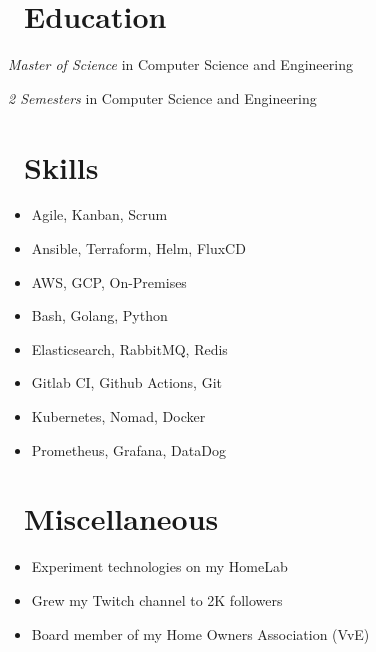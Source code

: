 \documentclass{resume}
\begin{document}
\begin{minipage}[t]{0.30\textwidth}
\section{\texorpdfstring{\textbf{}\ Education}{Education}}

\textit{Master of Science} in Computer Science and Engineering

\textit{2 Semesters} in Computer Science and Engineering

\section{\texorpdfstring{\textbf{}\ Skills}{Skills}}

\begin{itemize}[parsep=0.5ex]
  \item Agile, Kanban, Scrum
  \item Ansible, Terraform, Helm, FluxCD
  \item AWS, GCP, On-Premises
  \item Bash, Golang, Python
  \item Elasticsearch, RabbitMQ, Redis
  \item Gitlab CI, Github Actions, Git
  \item Kubernetes, Nomad, Docker
  \item Prometheus, Grafana, DataDog
\end{itemize}

\section{\texorpdfstring{\textbf{}\ Miscellaneous}{Miscellaneous}}
\begin{itemize}[parsep=0.5ex]
  \item Experiment technologies on my HomeLab
  \item Grew my Twitch channel to 2K followers
  \item Board member of my Home Owners Association (VvE)
\end{itemize}
  
\end{minipage}
\hfill
\end{document}
